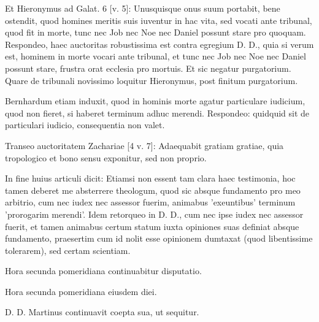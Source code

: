 Et Hieronymus ad Galat. 6 [v. 5]: Unusquisque onus suum portabit, bene ostendit, quod homines meritis suis iuventur in hac vita, sed vocati ante tribunal, quod fit in morte, tunc nec Job nec Noe nec Daniel possunt stare pro quoquam. Respondeo, haec auctoritas robustissima est contra egregium D. D., quia si verum est, hominem in morte vocari ante tribunal, et tunc nec Job nec Noe nec Daniel possunt stare, frustra orat ecclesia pro mortuis. Et sic negatur purgatorium. Quare de tribunali novissimo loquitur Hieronymus, post finitum purgatorium.

Bernhardum etiam induxit, quod in hominis morte agatur particulare iudicium, quod non fieret, si haberet terminum adhuc merendi. Respondeo: quidquid sit de particulari iudicio, consequentia non valet.

Transeo auctoritatem Zachariae [4 v. 7]: Adaequabit gratiam gratiae, quia tropologico et bono sensu exponitur, sed non proprio.

In fine huius articuli dicit: Etiamsi non essent tam clara haec testimonia, hoc tamen deberet me absterrere theologum, quod sic absque fundamento pro meo arbitrio, cum nec iudex nec assessor fuerim, animabus 'exeuntibus' terminum 'prorogarim merendi'. Idem retorqueo in D. D., cum nec ipse iudex nec assessor fuerit, et tamen animabus certum statum iuxta opiniones suas definiat absque fundamento, praesertim cum id nolit esse opinionem dumtaxat (quod libentissime tolerarem), sed certam scientiam.

Hora secunda pomeridiana continuabitur disputatio.

Hora secunda pomeridiana eiusdem diei.

D. D. Martinus continuavit coepta sua, ut sequitur.

